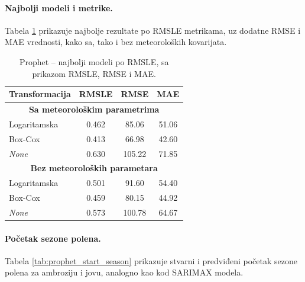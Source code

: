 \documentclass[12pt]{article}
\begin{document}
\paragraph{\textbf{Najbolji modeli i metrike.}}
Tabela \ref{tab:prophet_best_models} prikazuje najbolje rezultate po RMSLE metrikama, uz dodatne RMSE i MAE vrednosti, kako sa, tako i bez meteoroloških kovarijata.  

\begin{table}[h!]
\centering
\caption{Prophet – najbolji modeli po RMSLE, sa prikazom RMSLE, RMSE i MAE.}
\label{tab:prophet_best_models}
\renewcommand{\arraystretch}{1.2}
\begin{tabular}{|l|c|c|c|}
\hline
\textbf{Transformacija} & \textbf{RMSLE} & \textbf{RMSE} & \textbf{MAE} \\ \hline
\multicolumn{4}{|c|}{\textbf{Sa meteorološkim parametrima}} \\ \hline
Logaritamska      & 0.462  & 85.06 & 51.06 \\ \hline
Box-Cox  & 0.413  & 66.98 & 42.60 \\ \hline
\textit{None}     & 0.630  & 105.22 & 71.85 \\ \hline
\multicolumn{4}{|c|}{\textbf{Bez meteoroloških parametara}} \\ \hline
Logaritamska      & 0.501  & 91.60 & 54.40 \\ \hline
Box-Cox  & 0.459  & 80.15 & 44.92 \\ \hline
\textit{None}     & 0.573  & 100.78 & 64.67 \\ \hline
\end{tabular}
\end{table}


\paragraph{\textbf{Početak sezone polena.}}  
Tabela \ref{tab:prophet_start_season} prikazuje stvarni i predviđeni početak sezone polena za ambroziju i jovu, analogno kao kod SARIMAX modela.  
\end{document}

